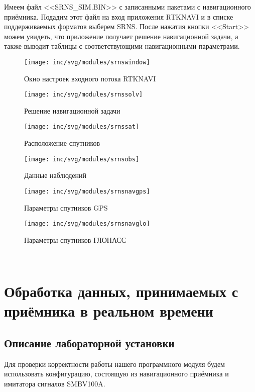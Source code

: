 Имеем файл <<SRNS\_SIM.BIN>> с записанными пакетами с навигационного приёмника. Подадим этот файл на вход приложения RTKNAVI и в списке поддерживаемых форматов выберем SRNS. После нажатия кнопки <<Start>> можем увидеть, что приложение получает решение навигационной задачи, а также выводит таблицы с соответствующими навигационными параметрами.
\begin{figure}[ht]
	\centering
	\texttt{[image: inc/svg/modules/srnswindow]}
	\caption{Окно настроек входного потока RTKNAVI}
	\label{fig:srnswindow}
\end{figure}
\begin{figure}[ht]
	\centering
	\texttt{[image: inc/svg/modules/srnssolv]}
	\caption{Решение навигационной задачи}
	\label{fig:srnssolv}
\end{figure}
\begin{figure}[h!]
	\centering
	\texttt{[image: inc/svg/modules/srnssat]}
	\caption{Расположение спутников}
	\label{fig:srnssat}
\end{figure}
\begin{figure}[h!]
	\centering
	\texttt{[image: inc/svg/modules/srnsobs]}
	\caption{Данные наблюдений}
	\label{fig:srnsobs}
\end{figure}
\begin{figure}[h!]
	\centering
	\texttt{[image: inc/svg/modules/srnsnavgps]}
	\caption{Параметры спутников GPS}
	\label{fig:srnsnavgps}
\end{figure}
\begin{figure}[h!]
	\centering
	\texttt{[image: inc/svg/modules/srnsnavglo]}
	\caption{Параметры спутников ГЛОНАСС}
	\label{fig:srnsnavglo}
\end{figure}

\
\section{Обработка данных, принимаемых с приёмника в реальном времени}
\subsection{Описание лабораторной установки}
Для проверки корректности работы нашего программного модуля будем использовать конфигурацию, состоящую из навигационного приёмника и имитатора сигналов SMBV100A.

